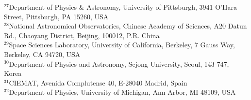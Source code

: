 {$^{27}$Department of Physics \& Astronomy, University of Pittsburgh, 3941 O'Hara Street, Pittsburgh, PA 15260, USA\\ 
$^{28}$National Astronomical Observatories, Chinese Academy of Sciences, A20 Datun Rd., Chaoyang District, Beijing, 100012, P.R. China\\ 
$^{29}$Space Sciences Laboratory, University of California, Berkeley, 7 Gauss Way, Berkeley, CA  94720, USA\\ 
$^{30}$Department of Physics and Astronomy, Sejong University, Seoul, 143-747, Korea\\ 
$^{31}$CIEMAT, Avenida Complutense 40, E-28040 Madrid, Spain\\ 
$^{32}$Department of Physics, University of Michigan, Ann Arbor, MI 48109, USA}
